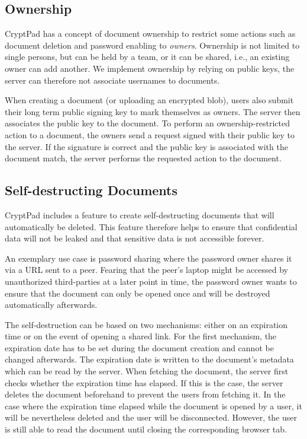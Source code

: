 \subsection{Ownership}
\label{sec:ownership}

CryptPad has a concept of document ownership to restrict some actions such as document deletion and password enabling to \textit{owners}.
Ownership is not limited to single persons, but can be held by a team, or it can be shared, i.e., an existing owner can add another.
We implement ownership by relying on public keys, the server can therefore not associate usernames to documents.

When creating a document (or uploading an encrypted blob), users also submit their long term public signing key to mark themselves as owners.
The server then associates the public key to the document.
To perform an ownership-restricted action to a document, the owners send a request signed with their public key to the server.
If the signature is correct and the public key is associated with the document match, the server performs the requested action to the document.

\subsection{Self-destructing Documents}
\label{sec:self-destructing}

CryptPad includes a feature to create self-destructing documents that will automatically be deleted.
This feature therefore helps to ensure that confidential data will not be leaked and that sensitive data is not accessible forever.

An exemplary use case is password sharing where the password owner shares it via a URL sent to a peer.
Fearing that the peer's laptop might be accessed by unauthorized third-parties at a later point in time, the password owner wants to ensure that the document can only be opened once and will be destroyed automatically afterwards.

The self-destruction can be based on two mechanisms: either on an expiration time or on the event of opening a shared link.
For the first mechanism, the expiration date has to be set during the document creation and cannot be changed afterwards.
The expiration date is written to the document's metadata which can be read by the server.
When fetching the document, the server first checks whether the expiration time has elapsed.
If this is the case, the server deletes the document beforehand to prevent the users from fetching it.
In the case where the expiration time elapsed while the document is opened by a user, it will be nevertheless deleted and the user will be disconnected.
However, the user is still able to read the document until closing the corresponding browser tab.

